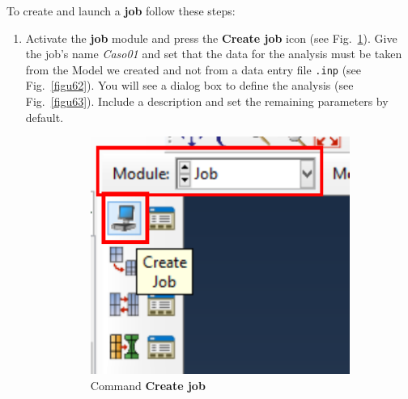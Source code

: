 To create and launch a \textbf {job} follow these steps:
\begin{enumerate}
\item Activate the \textbf{job} module and press the \textbf{Create
    job} icon (see Fig.~\ref{figu61}). Give the job's name
  \textit{Caso01} and set that the data for the analysis must be taken
  from the Model we created and not from a data entry file
  \texttt{.inp} (see Fig.~\ref{figu62}). You will see a dialog box to
  define the analysis (see Fig.~\ref{figu63}). Include a description
  and set the remaining parameters by default.
  \begin{figure}[H]
    \centering
    \begin{subfigure}{0.15\textwidth}
      \includegraphics[width=\textwidth]{./body/images/imagen61.pdf}
      \caption{Command \textbf{Create job}}
      \label{figu61}
    \end{subfigure}%
    ~ %
    \begin{subfigure}{0.33\textwidth}

\end{subfigure}
\end{figure}
\end{enumerate}
